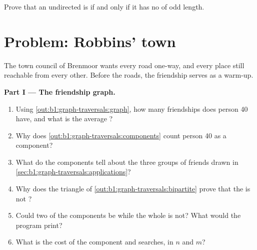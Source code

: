 \begin{exercise}[$\star\star\star$]\label{exo:b1:graph-traversals:12}
Prove that an undirected  is  if and only if it has no  of odd length.
\end{exercise}

\section{Problem: Robbins' town}\label{sec:b1:graph-traversals:problem}

\begin{problem}\label{pb:b1:graph-traversals:1}
The town council of Brenmoor wants every road one-way, and every place still reachable from every other. Before the
roads, the friendship  serves as a warm-up.
\label{lst:b1:graph-traversals:bridges}
\label{out:b1:graph-traversals:bridges}
\label{lst:b1:graph-traversals:orient}
\label{out:b1:graph-traversals:orient}

\medskip\noindent\textbf{Part I --- The friendship graph.}
\begin{enumerate}
\item Using \cref{out:b1:graph-traversals:graph}, how many friendships does person 40 have, and what is the average
?
\item Why does \cref{out:b1:graph-traversals:components} count person 40 as a component?
\item What do the components tell about the three groups of friends drawn in \cref{sec:b1:graph-traversals:applications}?
\item Why does the triangle of \cref{out:b1:graph-traversals:bipartite} prove that the  is not ?
\item Could two of the components be  while the whole  is not? What would the program print?
\item What is the cost of the component and  searches, in $n$ and $m$?
\end{enumerate}


\end{problem}
